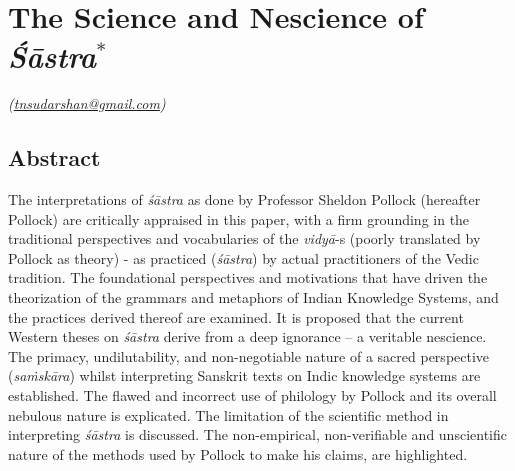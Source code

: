 \chapter{The Science and Nescience of {\sl\bfseries Śāstra}$^{*}$}\label{chapter\thechapter:begin}
\vskip -10pt



\hfill{\sl(\url{tnsudarshan@gmail.com})}


\section*{Abstract}

The interpretations of {\sl śāstra} as done by Professor Sheldon Pollock (hereafter Pollock) are critically appraised in this paper, with a firm grounding in the traditional perspectives and vocabularies of the {\sl vidyā}-s (poorly translated by Pollock as theory) - as practiced ({\sl śāstra}) by actual practitioners of the Vedic tradition. The foundational perspectives and motivations that have driven the theorization of the grammars and metaphors of Indian Knowledge Systems, and the practices derived thereof are examined. It is proposed that the current Western theses on {\sl śāstra} derive from a deep ignorance -- a veritable nescience. The primacy, undilutability, and non-negotiable nature of a sacred perspective ({\sl saṁskāra}) whilst interpreting Sanskrit texts on Indic knowledge systems are established. The flawed and incorrect use of philology by Pollock and its overall nebulous nature is explicated. The limitation of the scientific method in interpreting {\sl śāstra} is discussed. The non-empirical, non-verifiable and unscientific nature of the methods used by Pollock to make his claims, are highlighted. 

\newpage


